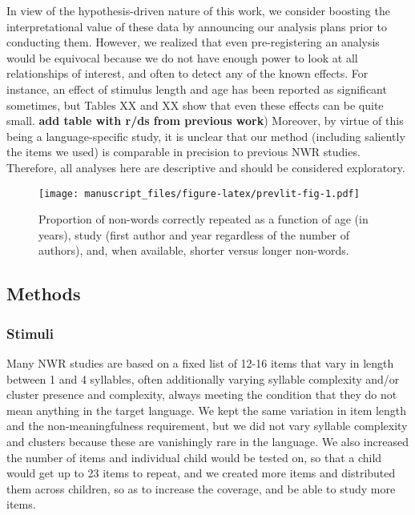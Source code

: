 \documentclass[english,,man,floatsintext]{apa6}
\begin{document}
In view of the hypothesis-driven nature of this work, we consider boosting the interpretational value of these data by announcing our analysis plans prior to conducting them. However, we realized that even pre-registering an analysis would be equivocal because we do not have enough power to look at all relationships of interest, and often to detect any of the known effects. For instance, an effect of stimulus length and age has been reported as significant sometimes, but Tables XX and XX show that even these effects can be quite small. \textbf{add table with r/ds from previous work})
Moreover, by virtue of this being a language-specific study, it is unclear that our method (including saliently the items we used) is comparable in precision to previous NWR studies. Therefore, all analyses here are descriptive and should be considered exploratory.

\begin{figure}
\centering
\texttt{[image: manuscript\_files/figure-latex/prevlit-fig-1.pdf]}
\caption{\label{fig:prevlit-fig}Proportion of non-words correctly repeated as a function of age (in years), study (first author and year regardless of the number of authors), and, when available, shorter versus longer non-words.}
\end{figure}

\hypertarget{methods}{%
\subsection{Methods}\label{methods}}

\hypertarget{stimuli}{%
\subsubsection{Stimuli}\label{stimuli}}

Many NWR studies are based on a fixed list of 12-16 items that vary in length between 1 and 4 syllables, often additionally varying syllable complexity and/or cluster presence and complexity, always meeting the condition that they do not mean anything in the target language. We kept the same variation in item length and the non-meaningfulness requirement, but we did not vary syllable complexity and clusters because these are vanishingly rare in the language. We also increased the number of items and individual child would be tested on, so that a child would get up to 23 items to repeat, and we created more items and distributed them across children, so as to increase the coverage, and be able to study more items.
\end{document}
